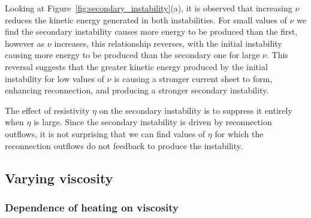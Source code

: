 Looking at Figure~\ref{fig:secondary_instability}(a), it is observed that increasing $\nu$ reduces the kinetic energy generated in both instabilities. For small values of $\nu$ we find the secondary instability causes more energy to be produced than the first, however as $\nu$ increases, this relationship reverses, with the initial instability causing more energy to be produced than the secondary one for large $\nu$. This reversal suggests that the greater kinetic energy produced by the initial instability for low values of $\nu$ is causing a stronger current sheet to form, enhancing reconnection, and producing a stronger secondary instability.

The effect of resistivity $\eta$ on the secondary instability is to suppress it entirely when $\eta$ is large. Since the secondary instability is driven by reconnection outflows, it is not surprising that we can find values of $\eta$ for which the reconnection outflows do not feedback to produce the instability.

\subsection{Varying viscosity}

\label{sec:visc_param_study}

\subsubsection{Dependence of heating on viscosity}

